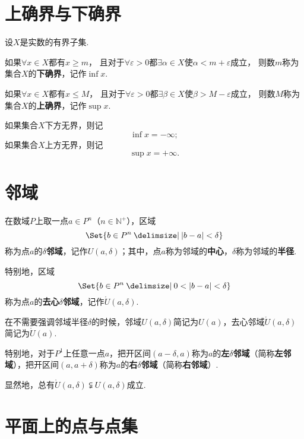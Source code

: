 \section{上确界与下确界}
\begin{definition}
设\(X\)是实数的有界子集.

如果\(\forall x \in X\)都有\(x \geqslant m\)，%
且对于\(\forall \varepsilon > 0\)都\(\exists \alpha \in X\)使\(\alpha < m + \varepsilon\)成立，%
则数\(m\)称为集合\(X\)的\textbf{下确界}，记作\(\inf{x}\).

如果\(\forall x \in X\)都有\(x \leqslant M\)，%
且对于\(\forall \varepsilon > 0\)都\(\exists \beta \in X\)使\(\beta > M - \varepsilon\)成立，%
则数\(M\)称为集合\(X\)的\textbf{上确界}，记作\(\sup{x}\).

如果集合\(X\)下方无界，则记\[
\inf{x} = -\infty;
\]如果集合\(X\)上方无界，则记\[
\sup{x} = +\infty.
\]
\end{definition}

\section{邻域}
\begin{definition}
在数域\(P\)上取一点\(a \in P^n\)（\(n\in\mathbb{N}^+\)），区域\[
\Set{b \in P^n \given \abs{b - a} < \delta}
\]称为点\(a\)的\(\delta\)\textbf{邻域}，记作\(U(a,\delta)\)；其中，点\(a\)称为邻域的\textbf{中心}，\(\delta\)称为邻域的\textbf{半径}.

特别地，区域\[
\Set{b \in P^n \given 0 < \abs{b - a} < \delta}
\]称为点\(a\)的\textbf{去心\(\delta\)邻域}，记作\(\mathring{U}(a,\delta)\).

在不需要强调邻域半径\(\delta\)的时候，邻域\(U(a,\delta)\)简记为\(U(a)\)，去心邻域\(\mathring{U}(a,\delta)\)简记为\(\mathring{U}(a)\).

特别地，对于\(P^1\)上任意一点\(a\)，把开区间\((a-\delta,a)\)称为\(a\)的\textbf{左\(\delta\)邻域}（简称\textbf{左邻域}），把开区间\((a,a+\delta)\)称为\(a\)的\textbf{右\(\delta\)邻域}（简称\textbf{右邻域}）.
\end{definition}

\begin{property}
显然地，总有\(\mathring{U}(a,\delta) \subsetneqq U(a,\delta)\)成立.
\end{property}

\section{平面上的点与点集}
